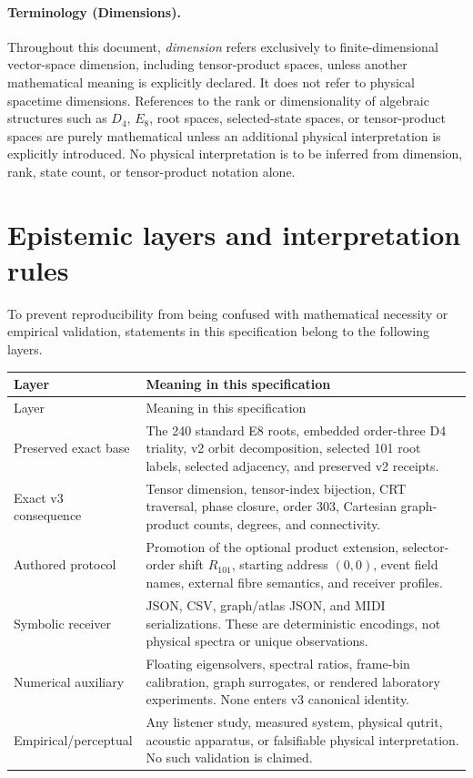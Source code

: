 \documentclass[11pt,a4paper]{article}
\theoremstyle{definition}
\begin{document}
\paragraph{Terminology (Dimensions).}
Throughout this document, \emph{dimension} refers exclusively to finite-dimensional vector-space dimension, including tensor-product spaces, unless another mathematical meaning is explicitly declared. It does not refer to physical spacetime dimensions. References to the rank or dimensionality of algebraic structures such as $D_4$, $E_8$, root spaces, selected-state spaces, or tensor-product spaces are purely mathematical unless an additional physical interpretation is explicitly introduced. No physical interpretation is to be inferred from dimension, rank, state count, or tensor-product notation alone.

\section{Epistemic layers and interpretation rules}
To prevent reproducibility from being confused with mathematical necessity or empirical validation, statements in this specification belong to the following layers.

\begin{longtable}{@{}p{36mm}p{114mm}@{}}
\toprule
Layer & Meaning in this specification \\
\midrule
\endfirsthead
\toprule
Layer & Meaning in this specification \\
\midrule
\endhead
Preserved exact base & The 240 standard E8 roots, embedded order-three D4 triality, v2 orbit decomposition, selected 101 root labels, selected adjacency, and preserved v2 receipts. \\
Exact v3 consequence & Tensor dimension, tensor-index bijection, CRT traversal, phase closure, order 303, Cartesian graph-product counts, degrees, and connectivity. \\
Authored protocol & Promotion of the optional product extension, selector-order shift $R_{101}$, starting address $(0,0)$, event field names, external fibre semantics, and receiver profiles. \\
Symbolic receiver & JSON, CSV, graph/atlas JSON, and MIDI serializations. These are deterministic encodings, not physical spectra or unique observations. \\
Numerical auxiliary & Floating eigensolvers, spectral ratios, frame-bin calibration, graph surrogates, or rendered laboratory experiments. None enters v3 canonical identity. \\
Empirical/perceptual & Any listener study, measured system, physical qutrit, acoustic apparatus, or falsifiable physical interpretation. No such validation is claimed. \\
\bottomrule
\end{longtable}
\end{document}
